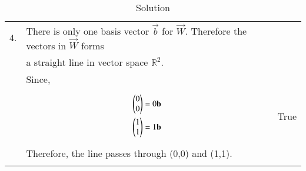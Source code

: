 \begin{longtable}{|l|l|l|}
\hline
4.&There is only one basis vector $\vec{b}$ for $\vec{W}$. Therefore the vectors in $\vec{W}$ forms &\\&a straight line in vector space $\mathbb{R}^2$.&\\&Since,&\\&\parbox{13cm}{\begin{align}
    \begin{pmatrix}0\\0\end{pmatrix}=0\mathbf{b}\\
    \begin{pmatrix}1\\1\end{pmatrix}=1\mathbf{b}
\end{align}}&True\\&Therefore, the line passes through (0,0) and (1,1).&\\
\hline
\caption{Solution}
\label{eq:solutions/2018/dec/77/sol}
\end{longtable}
\twocolumn
